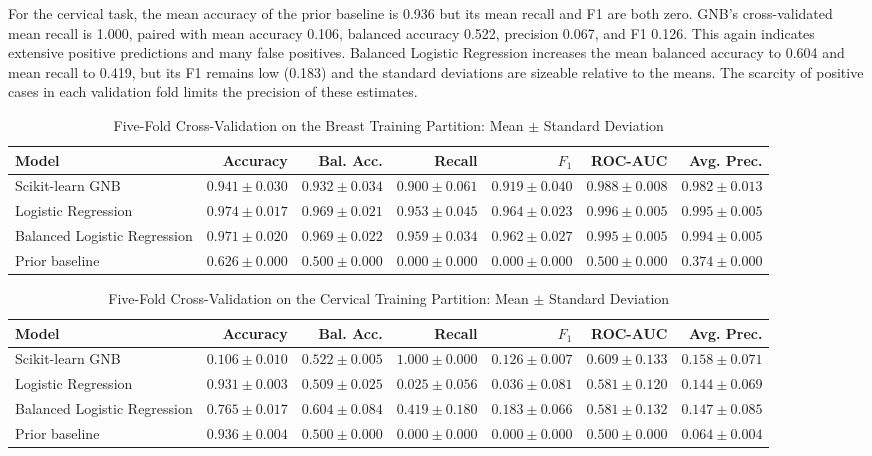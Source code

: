 \documentclass[conference]{IEEEtran}
\begin{document}
For the cervical task, the mean accuracy of the prior baseline is 0.936 but its mean recall and F1 are both zero. GNB's cross-validated mean recall is 1.000, paired with mean accuracy 0.106, balanced accuracy 0.522, precision 0.067, and F1 0.126. This again indicates extensive positive predictions and many false positives. Balanced Logistic Regression increases the mean balanced accuracy to 0.604 and mean recall to 0.419, but its F1 remains low (0.183) and the standard deviations are sizeable relative to the means. The scarcity of positive cases in each validation fold limits the precision of these estimates.

\begin{table}[!t]
\centering
\caption{Five-Fold Cross-Validation on the Breast Training Partition: Mean $\pm$ Standard Deviation}
\label{tab:breastcv}
\scriptsize
\setlength{\tabcolsep}{4pt}
\begin{tabular}{lrrrrrr}
\toprule
Model & Accuracy & Bal. Acc. & Recall & $F_1$ & ROC-AUC & Avg. Prec. \\
\midrule
Scikit-learn GNB & $0.941\pm0.030$ & $0.932\pm0.034$ & $0.900\pm0.061$ & $0.919\pm0.040$ & $0.988\pm0.008$ & $0.982\pm0.013$ \\
Logistic Regression & $0.974\pm0.017$ & $0.969\pm0.021$ & $0.953\pm0.045$ & $0.964\pm0.023$ & $0.996\pm0.005$ & $0.995\pm0.005$ \\
Balanced Logistic Regression & $0.971\pm0.020$ & $0.969\pm0.022$ & $0.959\pm0.034$ & $0.962\pm0.027$ & $0.995\pm0.005$ & $0.994\pm0.005$ \\
Prior baseline & $0.626\pm0.000$ & $0.500\pm0.000$ & $0.000\pm0.000$ & $0.000\pm0.000$ & $0.500\pm0.000$ & $0.374\pm0.000$ \\
\bottomrule
\end{tabular}
\end{table}

\begin{table}[!t]
\centering
\caption{Five-Fold Cross-Validation on the Cervical Training Partition: Mean $\pm$ Standard Deviation}
\label{tab:cervicalcv}
\scriptsize
\setlength{\tabcolsep}{4pt}
\begin{tabular}{lrrrrrr}
\toprule
Model & Accuracy & Bal. Acc. & Recall & $F_1$ & ROC-AUC & Avg. Prec. \\
\midrule
Scikit-learn GNB & $0.106\pm0.010$ & $0.522\pm0.005$ & $1.000\pm0.000$ & $0.126\pm0.007$ & $0.609\pm0.133$ & $0.158\pm0.071$ \\
Logistic Regression & $0.931\pm0.003$ & $0.509\pm0.025$ & $0.025\pm0.056$ & $0.036\pm0.081$ & $0.581\pm0.120$ & $0.144\pm0.069$ \\
Balanced Logistic Regression & $0.765\pm0.017$ & $0.604\pm0.084$ & $0.419\pm0.180$ & $0.183\pm0.066$ & $0.581\pm0.132$ & $0.147\pm0.085$ \\
Prior baseline & $0.936\pm0.004$ & $0.500\pm0.000$ & $0.000\pm0.000$ & $0.000\pm0.000$ & $0.500\pm0.000$ & $0.064\pm0.004$ \\
\bottomrule
\end{tabular}
\end{table}
\end{document}
